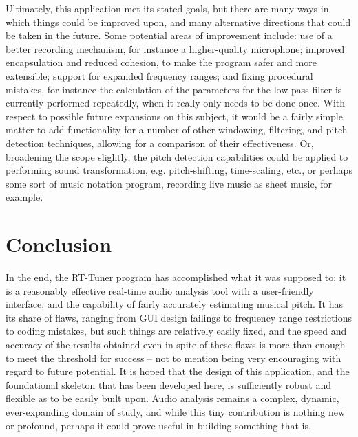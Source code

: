 \documentclass[12pt]{report}
\begin{document}
\indent Ultimately, this application met its stated goals, but there are many ways in which things could be improved upon, and many alternative directions that could be taken in the future. Some potential areas of improvement include: use of a better recording mechanism, for instance a higher-quality microphone; improved encapsulation and reduced cohesion, to make the program safer and more extensible; support for expanded frequency ranges; and fixing procedural mistakes, for instance the calculation of the parameters for the low-pass filter is currently performed repeatedly, when it really only needs to be done once. With respect to possible future expansions on this subject, it would be a fairly simple matter to add functionality for a number of other windowing, filtering, and pitch detection techniques, allowing for a comparison of their effectiveness. Or, broadening the scope slightly, the pitch detection capabilities could be applied to performing sound transformation, e.g. pitch-shifting, time-scaling, etc., or perhaps some sort of music notation program, recording live music as sheet music, for example. 
\clearpage

\chapter{Conclusion}
\indent In the end, the RT-Tuner program has accomplished what it was supposed to: it is a reasonably effective real-time audio analysis tool with a user-friendly interface, and the capability of fairly accurately estimating musical pitch. It has its share of flaws, ranging from GUI design failings to frequency range restrictions to coding mistakes, but such things are relatively easily fixed, and the speed and accuracy of the results obtained even in spite of these flaws is more than enough to meet the threshold for success -- not to mention being very encouraging with regard to future potential. It is hoped that the design of this application, and the foundational skeleton that has been developed here, is sufficiently robust and flexible as to be easily built upon. Audio analysis remains a complex, dynamic, ever-expanding domain of study, and while this tiny contribution is nothing new or profound, perhaps it could prove useful in building something that is.
\clearpage

\end{document}
